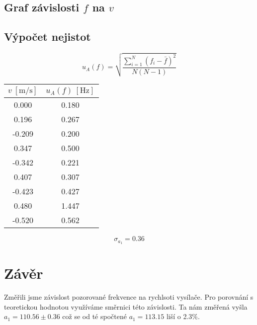 \documentclass[a4paper,10pt]{article}
\begin{document}
\subsection{Graf závislosti $f$ na $v$}
\begin{figure}[H]
    \centering
\end{figure}

\newpage
\subsection{Výpočet nejistot}
\begin{equation}
 u_A(f) = \sqrt{\frac{\sum_{i=1}^N (f_i - \bar{f})^2}{N(N-1)}}
\end{equation}
\begin{table}[!ht]
    \centering
    \begin{tabular}{|c|c|}
        $v\ [\si{\meter\per\second}]$ & $u_A(f)\ [\si{\hertz}]$ \\ \hline
        0.000 & 0.180 \\
        0.196 & 0.267 \\
        -0.209 & 0.200 \\
        0.347 & 0.500 \\
        -0.342 & 0.221 \\
        0.407 & 0.307 \\
        -0.423 & 0.427 \\
        0.480 & 1.447 \\
        -0.520 & 0.562 \\
    \end{tabular}
\end{table}

$$\sigma_{a_1} = 0.36$$
\section{Závěr}
Změřili jsme závislost pozorované frekvence na rychlsoti vysílače. Pro porovnání s teoretickou hodnotou využíváme směrnici této závislosti. Ta nám změřená vyšla $a_1 = 110.56 \pm 0.36$ což se od té spočtené $a_1 = 113.15$ liší o 2.3\%.
\end{document}
